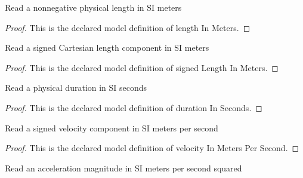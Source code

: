 \begin{definition}
  \label{def:physics:phyx-mini-0741:phyxminiproblems-problemphyxmini0741-lengthinmeters}
  Read a nonnegative physical length in SI meters
\end{definition}
\begin{proof}
  This is the declared model definition of length In Meters.
\end{proof}
\begin{definition}
  \label{def:physics:phyx-mini-0741:phyxminiproblems-problemphyxmini0741-signedlengthinmeters}
  Read a signed Cartesian length component in SI meters
\end{definition}
\begin{proof}
  This is the declared model definition of signed Length In Meters.
\end{proof}
\begin{definition}
  \label{def:physics:phyx-mini-0741:phyxminiproblems-problemphyxmini0741-durationinseconds}
  Read a physical duration in SI seconds
\end{definition}
\begin{proof}
  This is the declared model definition of duration In Seconds.
\end{proof}
\begin{definition}
  \label{def:physics:phyx-mini-0741:phyxminiproblems-problemphyxmini0741-velocityinmeterspersecond}
  Read a signed velocity component in SI meters per second
\end{definition}
\begin{proof}
  This is the declared model definition of velocity In Meters Per Second.
\end{proof}
\begin{definition}
  \label{def:physics:phyx-mini-0741:phyxminiproblems-problemphyxmini0741-accelerationinmeterspersecondsquared}
  Read an acceleration magnitude in SI meters per second squared
\end{definition}
